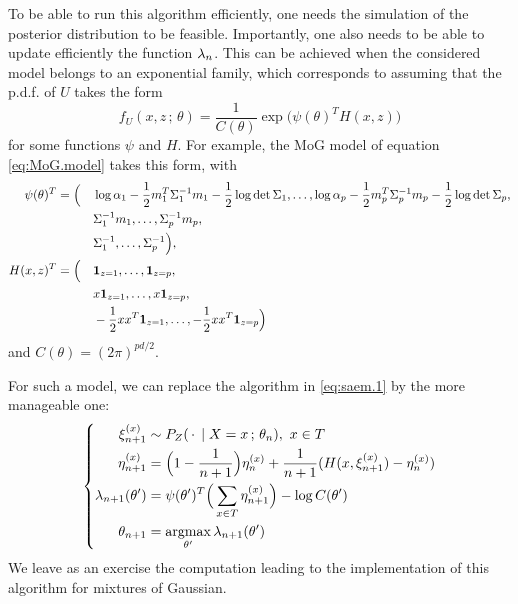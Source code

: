 To be able to run this algorithm efficiently, one needs the simulation of  the posterior distribution to be feasible. Importantly, one also needs to be able to update efficiently the function $\lambda_n$. This can be achieved when the considered model belongs to an exponential family, which corresponds to assuming that the p.d.f. of $U$ takes the form
\[
f_U(x,z\,;\,\theta) = \frac{1}{C(\theta)} \exp\big(\psi(\theta)^TH(x,z)\big)
\]
for some  functions $\psi$ and $H$. For example, the MoG model of equation \cref{eq:MoG.model} takes this form, with
\begin{align*}
\psi(\theta)^T &=\Big (&&\log \alpha_1 -\frac12 m_1^T\Sigma_1^{-1} m_1 -\frac12 \log\det\Sigma_1, \ldots, \log\alpha_p - \frac12 m_p^T\Sigma_p^{-1} m_p-\frac12 \log\det\Sigma_p,\\
 &&&\Sigma_1^{-1}m_1, \ldots, \Sigma_p^{-1} m_p,\\
 &&& \Sigma_1^{-1}, \ldots, \Sigma_p^{-1}\Big),\\
H(x,z)^T &= \Big(&&{\bm 1}_{z=1}, \ldots, {\bm 1}_{z=p},\\
&&&x{\bm 1}_{z=1}, \ldots, x{\bm 1}_{z=p},\\
&&& -\frac12 xx^T{\bm 1}_{z=1}, \ldots,-\frac12 xx^T{\bm 1}_{z=p} \Big)
\end{align*}
and
$C(\theta) = (2\pi)^{pd/2}$.

For such a model, we can replace the algorithm in \cref{eq:saem.1} by the more manageable one:
\begin{equation}
\left\{
\begin{aligned}
\xi^{(x)}_{n+1} & \sim P_Z(\,\cdot\,\mid X=x\,;\,\theta_n),\  x\in T\\
\eta^{(x)}_{n+1} &= \Big(1-\frac1{n+1}\Big)\eta^{(x)}_n + \frac1{n+1} (H(x, \xi^{(x)}_{n+1}) - \eta^{(x)}_n)\\
\lambda_{n+1}(\theta') &= \psi(\theta')^T \Big(\sum_{x\in T} \eta^{(x)}_{n+1}\Big) - \log C(\theta')\\
\theta_{n+1} &= \operatorname*{argmax}_{\theta'}  \lambda_{n+1}(\theta')
\end{aligned}
\right.
\label{eq:saem.2}
\end{equation}
We leave as an exercise the  computation leading to the implementation of this algorithm for mixtures of Gaussian.

